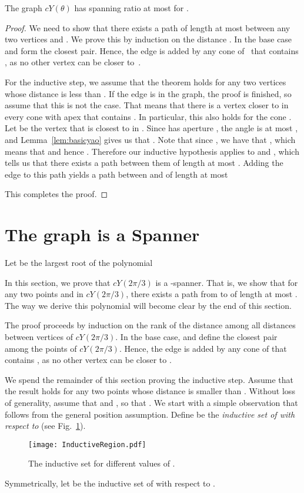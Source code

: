 \documentclass{cccg14}
\newcommand{\cyao}{\ensuremath{cY(\theta)}\xspace}
\newcommand{\cyaoOneTwenty}{\ensuremath{cY(2\pi/3)}\xspace}
\begin{document}
\begin{theorem}
 \label{thm:contyaosmall}
 The graph \cyao has spanning ratio at most  for .
\end{theorem}
\begin{proof}
 We need to show that there exists a path of length at most  between any two vertices  and . We prove this by induction on the distance . In the base case  and  form the closest pair. Hence, the edge  is added by any cone of~ that contains , as no other vertex can be closer to~.
 
 For the inductive step, we assume that the theorem holds for any two vertices whose distance is less than . If the edge  is in the graph, the proof is finished, so assume that this is not the case. That means that there is a vertex closer to  in every cone with apex  that contains . In particular, this also holds for the cone . Let  be the vertex that is closest to  in . Since   has aperture , the angle  is at most , and Lemma~\ref{lem:basicyao} gives us that 
 . Note that since , we have that , which means that  and hence . Therefore our inductive hypothesis applies to  and , which tells us that there exists a path between them of length at most . Adding the edge  to this path yields a path between  and  of length at most

\vspace{-1em}

This completes the proof.
\end{proof}


\section{The graph  is a Spanner}\label{section:The 2pi/3 cyao}

Let  be the largest root of the polynomial

In this section, we prove that \cyaoOneTwenty is a -spanner.
That is, we show that for any two points  and  in \cyaoOneTwenty, there exists a path from  to  of length at most . The way we derive this polynomial will become clear by the end of this section.

The proof proceeds by induction on the rank of the distance  among all distances between vertices of \cyaoOneTwenty.
In the base case,
 and  define the closest pair among the points of \cyaoOneTwenty.
Hence, the edge  is added by any cone of  that contains ,
as no other vertex can be closer to .

We spend the remainder of this section proving the inductive step.
Assume that the result holds for any two points whose distance is smaller than .
Without loss of generality,
assume that  and ,
so that .
We start with a simple observation that follows from the general position assumption.
Define  be the \emph{inductive set of  with respect to }
(see Fig.~\ref{fig:Inductive Region}).
\begin{figure}[t]
\centering
\texttt{[image: InductiveRegion.pdf]}
\caption{\small The inductive set  for different values of .}
\label{fig:Inductive Region}
\end{figure}
Symmetrically,
let  be the inductive set of  with respect to .
\end{document}
